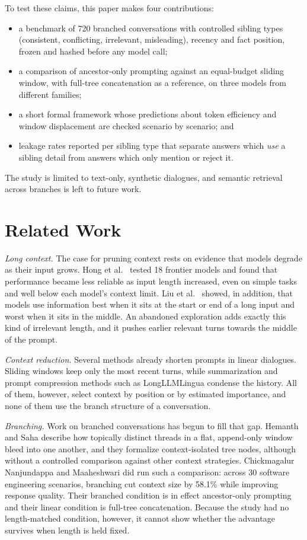 \documentclass[conference]{IEEEtran}
\theoremstyle{definition}
\begin{document}
To test these claims, this paper makes four contributions:
\begin{itemize}
  \item a benchmark of 720 branched conversations with controlled sibling types (consistent, conflicting, irrelevant, misleading), recency and fact position, frozen and hashed before any model call;
  \item a comparison of ancestor-only prompting against an equal-budget sliding window, with full-tree concatenation as a reference, on three models from different families;
  \item a short formal framework whose predictions about token efficiency and window displacement are checked scenario by scenario; and
  \item leakage rates reported per sibling type that separate answers which \emph{use} a sibling detail from answers which only mention or reject it.
\end{itemize}
The study is limited to text-only, synthetic dialogues, and semantic retrieval across branches is left to future work.

\section{Related Work}

\textit{Long context.} The case for pruning context rests on evidence that models degrade as their input grows. Hong et al.\ \cite{hong2025contextrot} tested 18 frontier models and found that performance became less reliable as input length increased, even on simple tasks and well below each model's context limit. Liu et al.\ \cite{liu2024lost} showed, in addition, that models use information best when it sits at the start or end of a long input and worst when it sits in the middle. An abandoned exploration adds exactly this kind of irrelevant length, and it pushes earlier relevant turns towards the middle of the prompt.

\textit{Context reduction.} Several methods already shorten prompts in linear dialogues. Sliding windows keep only the most recent turns, while summarization and prompt compression methods such as LongLLMLingua \cite{jiang2024longllmlingua} condense the history. All of them, however, select context by position or by estimated importance, and none of them use the branch structure of a conversation.

\textit{Branching.} Work on branched conversations has begun to fill that gap. Hemanth and Saha \cite{hemanth2026cta} describe how topically distinct threads in a flat, append-only window bleed into one another, and they formalize context-isolated tree nodes, although without a controlled comparison against other context strategies. Chickmagalur Nanjundappa and Maaheshwari \cite{nanjundappa2025branching} did run such a comparison: across 30 software engineering scenarios, branching cut context size by 58.1\% while improving response quality. Their branched condition is in effect ancestor-only prompting and their linear condition is full-tree concatenation. Because the study had no length-matched condition, however, it cannot show whether the advantage survives when length is held fixed.
\end{document}
